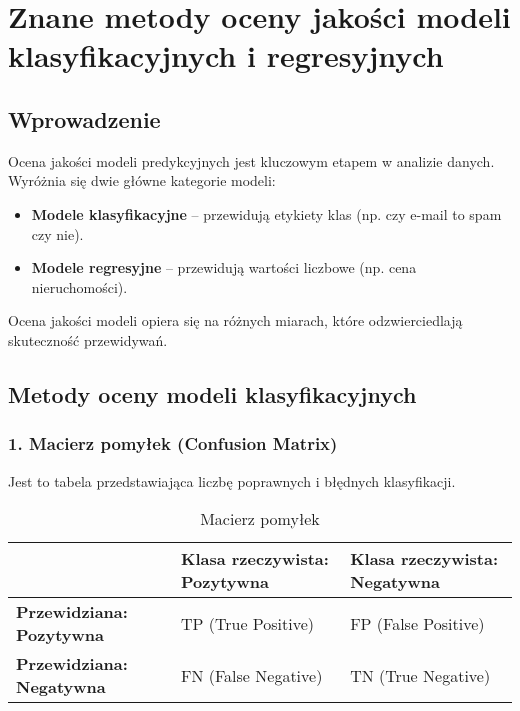 \section{Znane metody oceny jakości modeli klasyfikacyjnych i regresyjnych}

\subsection{Wprowadzenie}
Ocena jakości modeli predykcyjnych jest kluczowym etapem w analizie danych. Wyróżnia się dwie główne kategorie modeli:
\begin{itemize}
    \item \textbf{Modele klasyfikacyjne} – przewidują etykiety klas (np. czy e-mail to spam czy nie).
    \item \textbf{Modele regresyjne} – przewidują wartości liczbowe (np. cena nieruchomości).
\end{itemize}
Ocena jakości modeli opiera się na różnych miarach, które odzwierciedlają skuteczność przewidywań.

\subsection{Metody oceny modeli klasyfikacyjnych}

\subsubsection{1. Macierz pomyłek (Confusion Matrix)}
Jest to tabela przedstawiająca liczbę poprawnych i błędnych klasyfikacji.

\begin{table}[h]
    \centering
    \begin{tabularx}{\textwidth}{|X|X|X|}  %
        \hline
        & \textbf{Klasa rzeczywista: Pozytywna} & \textbf{Klasa rzeczywista: Negatywna} \\
        \hline
        \textbf{Przewidziana: Pozytywna} & TP (True Positive) & FP (False Positive) \\
        \hline
        \textbf{Przewidziana: Negatywna} & FN (False Negative) & TN (True Negative) \\
        \hline
    \end{tabularx}
    \caption{Macierz pomyłek}
\end{table}

